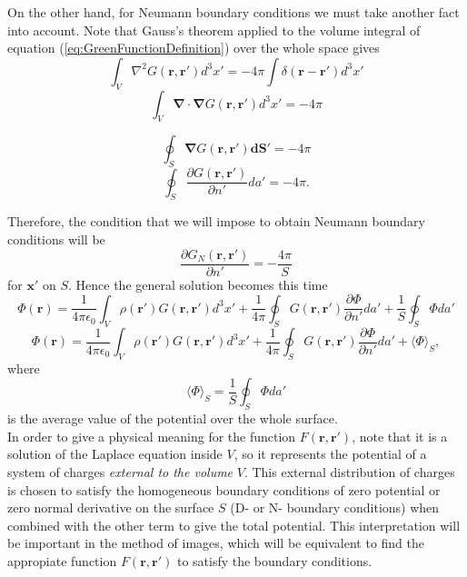 On the other hand, for Neumann boundary conditions we must take another fact into account. Note that Gauss's theorem applied to the volume integral of equation (\ref{eq:GreenFunctionDefinition}) over the whole space gives
\begin{equation}
\int_V \nabla^2 G(\textbf{r}, \textbf{r}') d^3x' = -4\pi \int \delta(\textbf{r} - \textbf{r}') d^3x'
\end{equation}
\begin{equation}
\int_V \boldsymbol{\nabla} \cdot  \boldsymbol{\nabla}  G(\textbf{r}, \textbf{r}') d^3x' = -4\pi 
\end{equation}

\begin{equation}
\oint_S   \boldsymbol{\nabla}  G(\textbf{r}, \textbf{r}') \textbf{dS}' = -4\pi 
\end{equation}
\begin{equation}
\oint_S   \frac{\partial G(\textbf{r}, \textbf{r}')}{\partial n'} da' = -4\pi .
\end{equation}

Therefore, the condition that we will impose to obtain Neumann boundary conditions will be
\begin{equation}
\frac{\partial G_N(\textbf{r}, \textbf{r}')}{\partial n'} = -\frac{4\pi}{S}
\end{equation}
for $\textbf{x}'$ on $S$. Hence the general solution becomes this time
\begin{equation}
 \Phi (\textbf{r}) = \frac{1}{4 \pi  \epsilon_0} \int_V \rho (\textbf{r}') G(\textbf{r}, \textbf{r}')   d^3x' +\frac{1}{4\pi} \oint_S G(\textbf{r}, \textbf{r}') \frac{\partial \Phi}{\partial n'}da' + \frac{1}{S} \oint_S  \Phi  da'
\end{equation}
\begin{equation}
 \Phi (\textbf{r}) = \frac{1}{4 \pi  \epsilon_0} \int_V \rho (\textbf{r}') G(\textbf{r}, \textbf{r}')   d^3x' +\frac{1}{4\pi} \oint_S G(\textbf{r}, \textbf{r}') \frac{\partial \Phi}{\partial n'}da' + \langle \Phi \rangle _S,
\end{equation}
where
\begin{equation}
\langle \Phi \rangle _S =  \frac{1}{S} \oint_S  \Phi  da'
\end{equation}
is the average value of the potential over the whole surface.\\
\bigskip
In order to give a physical meaning for the function $F(\textbf{r}, \textbf{r}')$, note that it is a solution of the Laplace equation inside $V$, so it represents the potential of a system of charges \textit{external to the volume } $V$. This  external distribution of charges is chosen to satisfy the homogeneous boundary conditions of zero potential or zero normal derivative on the surface $S$ (D- or N- boundary conditions) when combined with the other term to give  the total potential. This interpretation will be important in the method of images, which will be equivalent to find the appropiate function $F(\textbf{r}, \textbf{r}')$ to satisfy the boundary conditions.

